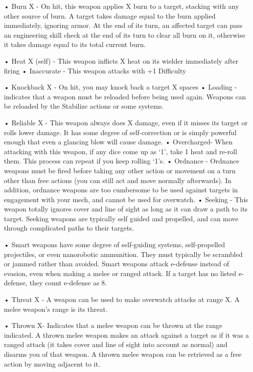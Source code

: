 •  Burn X - On hit, this weapon applies X burn to a target, stacking with any other source of burn.  
  A target takes damage equal to the burn applied immediately, ignoring armor. At the end of its  
  turn, an affected target can pass an engineering skill check at the end of its turn to clear all  
  burn on it, otherwise it takes damage equal to its total current burn.
 

                                                                                                                


•  Heat X (self) - This weapon inflicts X heat on its wielder immediately after firing  
•  Inaccurate - This weapon attacks with +1 Difficulty
 
•  Knockback X - On hit, you may knock back a target X spaces  
•  Loading - indicates that a weapon must be reloaded before being used again. Weapons can  
  be reloaded by the Stabilize actions or some systems.
 
•  Reliable X - This weapon always does X damage, even if it misses its target or rolls lower  
  damage. It has some degree of self-correction or is simply powerful enough that even a  
  glancing blow will cause damage.  
•  Overcharged- When attacking with this weapon, if any dice come up as ‘1’, take 1 heat and  
  re-roll them. This process can repeat if you keep rolling ‘1’s.  
•  Ordnance - Ordnance weapons must be fired before taking any other action or movement on a  
  turn other than free actions (you can still act and move normally afterwards). In addition,  
  ordnance weapons are too cumbersome to be used against targets in engagement with your  
  mech, and cannot be used for overwatch.  
•  Seeking - This weapon totally ignores cover and line of sight as long as it can draw a path to  
  its target. Seeking weapons are typically self guided and propelled, and can move through  
  complicated paths to their targets.
 
•  Smart weapons have some degree of self-guiding systems, self-propelled projectiles, or even  
  nanorobotic ammunition. They must typically be scrambled or jammed rather than avoided.  
  Smart weapons attack e-defense instead of evasion, even when making a melee or ranged  
  attack. If a target has no listed e-defense, they count e-defense as 8.
 
•  Threat X - A weapon can be used to make overwatch attacks at range X. A melee weapon’s  
  range is its threat.
 
•  Thrown X- Indicates that a melee weapon can be thrown at the range indicated. A thrown  
  melee weapon makes an attack against a target as if it was a ranged attack (it takes cover and  
  line of sight into account as normal) and disarms you of that weapon. A thrown melee weapon  
  can be retrieved as a free action by moving adjacent to it.
 


